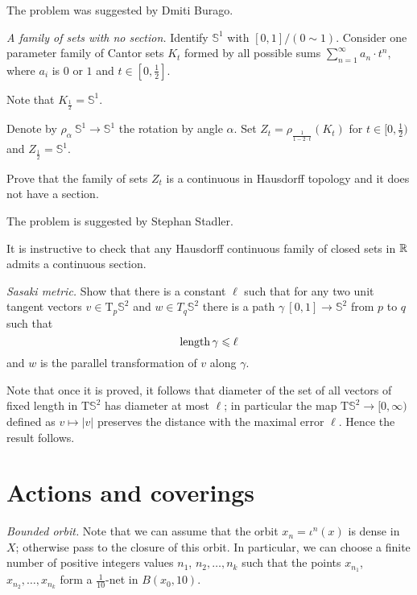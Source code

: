 The problem was suggested by Dmiti Burago.





\textit{A family of sets with no section.}
Identify $\mathbb{S}^1$ with $[0,1]/(0\sim 1)$.
Consider one parameter family of Cantor sets $K_t$
formed by all possible sums $\sum_{n=1}^\infty a_n\cdot t^n$,
where $a_i$ is $0$ or $1$ and $t\in[0,\tfrac12]$.

Note that $K_{\frac12}=\mathbb{S}^1$.

Denote by $\rho_\alpha\:\mathbb{S}^1\to\mathbb{S}^1$ 
the rotation by angle $\alpha$.
Set $Z_t=\rho_{\frac1{1-2\cdot t}}(K_t)$ for $t\in[0,\tfrac12)$ and $Z_{\frac12}=\mathbb{S}^1$.

Prove that the family of sets $Z_t$
is a continuous in Hausdorff topology and it does not have a section.

 The problem is suggested by Stephan Stadler.

It is instructive to check that any Hausdorff continuous family of closed sets in $\mathbb{R}$ admits a continuous section.



\textit{Sasaki metric.}
Show that there is a constant $\ell$
such that for any two unit tangent vectors $v\in\mathrm{T}_p\mathbb{S}^2$ 
and $w\in T_q\mathbb{S}^2$
there is a path 
$\gamma\:[0,1]\to\mathbb{S}^2$ from $p$ to $q$
such that 
\[\operatorname{\rm length} \gamma\leqslant \ell\] 
and
$w$ is the parallel transformation of $v$ along $\gamma$.

Note that once it is proved, 
it follows that diameter of the set of all vectors of fixed length in $\mathrm{T} \mathbb{S}^2$ has diameter at most $\ell$;
in particular the map $\mathrm{T}\mathbb{S}^2\to[0,\infty)$ defined as $v\mapsto |v|$ 
preserves the distance with the maximal error $\ell$.
Hence the result follows.

\section*{Actions and coverings}




\textit{Bounded orbit.}
Note that we can assume that the orbit $x_n=\iota^n(x)$ is dense in $X$;
otherwise pass to the closure of this orbit.
In particular, we can choose a finite number of positive integers values $n_1$, $n_2,\dots,n_k$
such that the points $x_{n_1}$, $x_{n_2},\dots,x_{n_k}$ form a $\tfrac1{10}$-net in $B(x_0,10)$.


